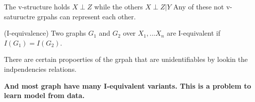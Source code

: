 The v-structure holds $X \perp Z$ while the others $X \perp Z | Y $
Any of these not v-satuructre grpahs can represent each other.

\begin{definition}(I-equivalence)
 Two graphs $G_1$ and $G_2$ over $X_1, ... X_n$ are I-equivalent if $I(G_1)=I(G_2)$.
\end{definition}

\begin{framed}
 \centering
 There are certain propoerties of the grpah that are unidentifiables by lookin the indpendencies relations.
\end{framed}

\textbf{And most graph have many I-equivalent variants.
This is a problem to learn model from data.}




  
  





